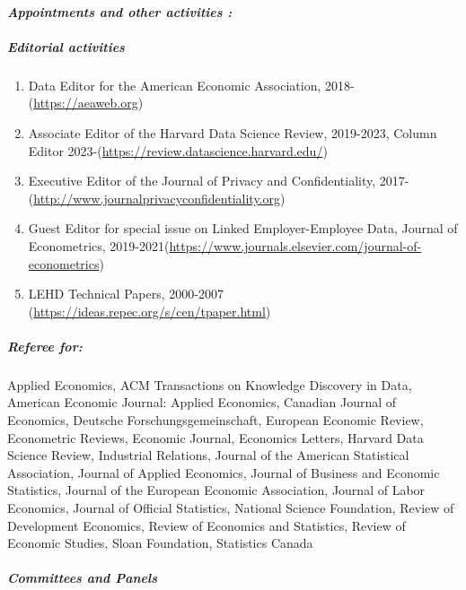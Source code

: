\documentclass[10pt,letterpaper]{report}
\begin{document}
\paragraph{\it \bf Appointments and other activities :}%
\subparagraph{Editorial activities}
\begin{enumerate}
	\item Data Editor for the American Economic Association, 2018- \newline (\url{https://aeaweb.org})
	\item Associate Editor of the Harvard Data Science Review, 2019-2023, Column Editor 2023-\newline (\url{https://review.datascience.harvard.edu/})
	\item Executive Editor of the Journal of Privacy and Confidentiality, 2017-\newline (\url{http://www.journalprivacyconfidentiality.org})
	\item Guest Editor for special issue on Linked Employer-Employee Data, Journal of Econometrics, 2019-2021\newline (\url{https://www.journals.elsevier.com/journal-of-econometrics})
	\item LEHD Technical Papers, 2000-2007 \newline (\url{https://ideas.repec.org/s/cen/tpaper.html})
\end{enumerate}
\subparagraph{ Referee for:}
  Applied Economics,
  ACM   Transactions on Knowledge Discovery in Data, 
  American Economic Journal: Applied Economics,
  Canadian Journal of Economics, 
  Deutsche Forschungsgemeinschaft,
  European Economic Review,  
  Econometric Reviews, 
  Economic Journal,  
  Economics Letters,
  Harvard Data Science Review,
  Industrial Relations, 
  Journal of the American Statistical Association,
  Journal of Applied Economics, 
  Journal of Business and Economic Statistics,  
  Journal of the European Economic Association,
  Journal of Labor   Economics, 
  Journal of Official Statistics,
  National Science Foundation,
  Review of Development Economics, 
  Review of Economics and Statistics,
  Review of Economic Studies,
  Sloan Foundation,
  Statistics Canada
\subparagraph{Committees and Panels} 
\end{document}
